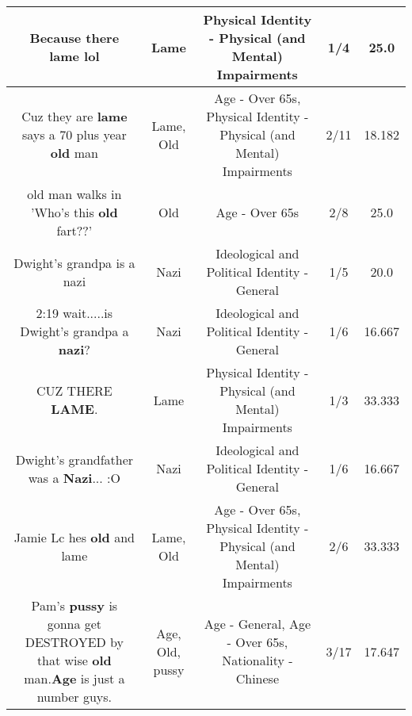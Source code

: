 \documentclass[11pt]{article}
\newlength\mylength
\begin{document}
\begin{center}
\begin{longtable}{|C{.65\mylength}|C{.30\mylength}|C{.12\mylength}|C{.12\mylength}|C{.12\mylength}|}
  \small Because there \textbf{lame} lol\normalsize   & Lame & Physical Identity - Physical (and Mental) Impairments & 1/4 & 25.0 \\  \hline
  \small Cuz they are \textbf{lame} says a 70 plus year \textbf{old} man\normalsize   & Lame, Old & Age - Over 65s, Physical Identity - Physical (and Mental) Impairments & 2/11 & 18.182 \\  \hline
  \small old man walks in 'Who's this \textbf{old} fart??'\normalsize   & Old & Age - Over 65s & 2/8 & 25.0 \\  \hline
  \small Dwight's grandpa is a nazi\normalsize   & Nazi &  Ideological and Political Identity - General & 1/5 & 20.0 \\  \hline
  \small 2:19 wait.....is Dwight's grandpa a \textbf{nazi}?\normalsize   & Nazi &  Ideological and Political Identity - General & 1/6 & 16.667 \\  \hline
  \small CUZ THERE \textbf{LAME}.\normalsize   & Lame & Physical Identity - Physical (and Mental) Impairments & 1/3 & 33.333 \\  \hline
  \small Dwight's grandfather was a \textbf{Nazi}... :O\normalsize   & Nazi &  Ideological and Political Identity - General & 1/6 & 16.667 \\  \hline
  \small Jamie Lc hes \textbf{old} and lame\normalsize   & Lame, Old & Age - Over 65s, Physical Identity - Physical (and Mental) Impairments & 2/6 & 33.333 \\  \hline
  \small Pam's \textbf{pussy} is gonna get DESTROYED by that wise \textbf{old} man.\textbf{Age} is just a number guys.\normalsize   & Age, Old, pussy & Age - General, Age - Over 65s, Nationality - Chinese & 3/17 & 17.647 \\  \hline

\end{longtable}
\end{center}
\end{document}
